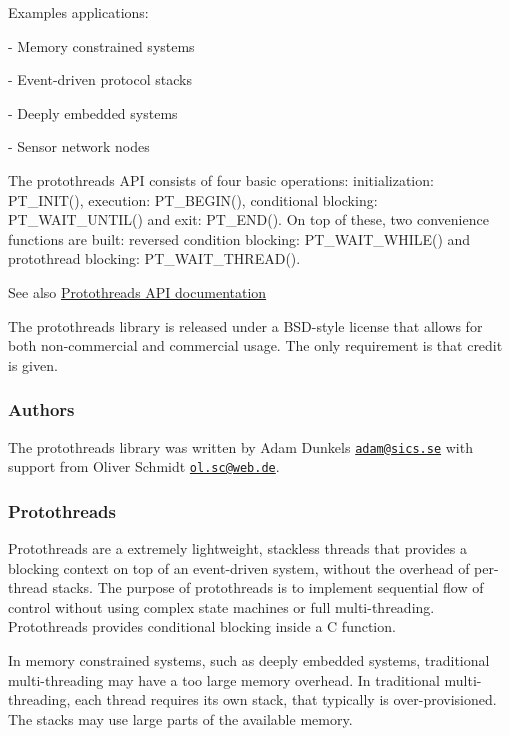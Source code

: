 Examples applications\+: \begin{DoxyVerb}- Memory constrained systems

- Event-driven protocol stacks

- Deeply embedded systems

- Sensor network nodes
\end{DoxyVerb}


The protothreads A\+PI consists of four basic operations\+: initialization\+: P\+T\+\_\+\+I\+N\+I\+T(), execution\+: P\+T\+\_\+\+B\+E\+G\+I\+N(), conditional blocking\+: P\+T\+\_\+\+W\+A\+I\+T\+\_\+\+U\+N\+T\+I\+L() and exit\+: P\+T\+\_\+\+E\+N\+D(). On top of these, two convenience functions are built\+: reversed condition blocking\+: P\+T\+\_\+\+W\+A\+I\+T\+\_\+\+W\+H\+I\+L\+E() and protothread blocking\+: P\+T\+\_\+\+W\+A\+I\+T\+\_\+\+T\+H\+R\+E\+A\+D().

\begin{DoxySeeAlso}{See also}
\hyperlink{a00066}{Protothreads A\+PI documentation}
\end{DoxySeeAlso}
The protothreads library is released under a B\+S\+D-\/style license that allows for both non-\/commercial and commercial usage. The only requirement is that credit is given.\hypertarget{a00066_authors}{}\subsubsection{Authors}\label{a00066_authors}
The protothreads library was written by Adam Dunkels \href{mailto:adam@sics.se}{\tt adam@sics.\+se} with support from Oliver Schmidt \href{mailto:ol.sc@web.de}{\tt ol.\+sc@web.\+de}.\hypertarget{a00066_pt-desc}{}\subsubsection{Protothreads}\label{a00066_pt-desc}
Protothreads are a extremely lightweight, stackless threads that provides a blocking context on top of an event-\/driven system, without the overhead of per-\/thread stacks. The purpose of protothreads is to implement sequential flow of control without using complex state machines or full multi-\/threading. Protothreads provides conditional blocking inside a C function.

In memory constrained systems, such as deeply embedded systems, traditional multi-\/threading may have a too large memory overhead. In traditional multi-\/threading, each thread requires its own stack, that typically is over-\/provisioned. The stacks may use large parts of the available memory.

